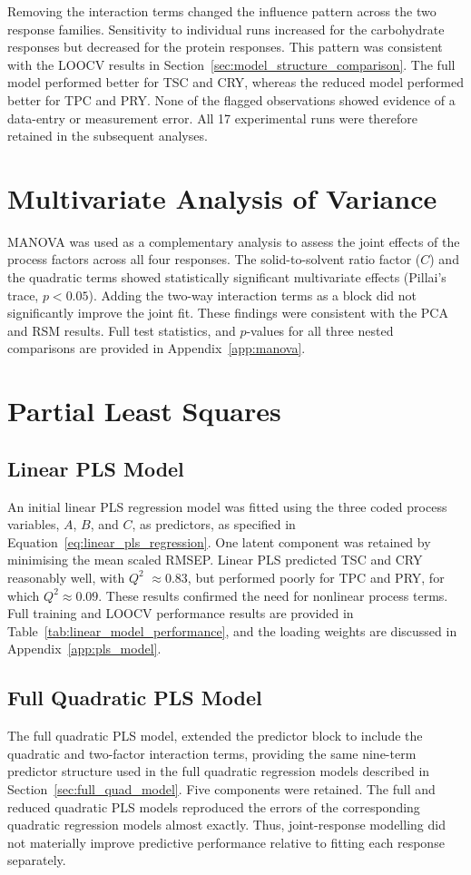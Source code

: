 \documentclass[MScDSA]{uccthesis}
\begin{document}
Removing the interaction terms changed the influence pattern across the two response families. Sensitivity to individual runs increased for the carbohydrate responses but decreased for the protein responses. This pattern was consistent with the LOOCV results in Section~\ref{sec:model_structure_comparison}. The full model performed better for TSC and CRY, whereas the reduced model performed better for TPC and PRY. None of the flagged observations showed evidence of a data-entry or measurement error. All 17 experimental runs were therefore retained in the subsequent analyses.

\section{Multivariate Analysis of Variance}
\label{sec:manova_res}
MANOVA was used as a complementary analysis to assess the joint effects of the process factors across all four responses. The solid-to-solvent ratio factor ($C$) and the quadratic terms showed statistically significant multivariate effects (Pillai's trace, $p < 0.05$). Adding the two-way interaction terms as a block did not significantly improve the joint fit. These findings were consistent with the PCA and RSM results. Full test statistics, and $p$-values for all three nested comparisons are provided in Appendix~\ref{app:manova}.

\section{Partial Least Squares}
\label{sec:PLS}

\subsection{Linear PLS Model}
\label{sec:linear_pls}
An initial linear PLS regression model was fitted using the three coded process variables, $A$, $B$, and $C$, as predictors, as specified in Equation~\ref{eq:linear_pls_regression}. One latent component was retained by minimising the mean scaled RMSEP. Linear PLS predicted TSC and CRY reasonably well, with $Q^2$ $\approx 0.83$, but performed poorly for TPC and PRY, for which $Q^2 \approx 0.09$. These results confirmed the need for nonlinear process terms. Full training and LOOCV performance results are provided in Table~\ref{tab:linear_model_performance}, and the loading weights are discussed in Appendix~\ref{app:pls_model}.

\subsection{Full Quadratic PLS Model}
\label{sec:full_quad_pls}
 The full quadratic PLS model, extended the predictor block to include the quadratic and two-factor interaction terms, providing the same nine-term predictor structure used in the full quadratic regression models described in Section~\ref{sec:full_quad_model}. Five components were retained. The full and reduced quadratic PLS models reproduced the errors of the corresponding quadratic regression models almost exactly. Thus, joint-response modelling did not materially improve predictive performance relative to fitting each response separately.
 
\end{document}
